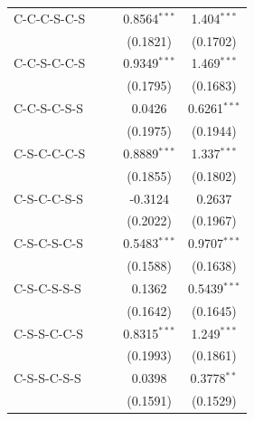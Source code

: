 \begin{table}[htbp]
\begin{tabular}{lcccc}
      C-C-C-S-C-S                     &                &                & 0.8564$^{***}$ & 1.404$^{***}$\\   
                                      &                &                & (0.1821)       & (0.1702)\\   
      C-C-S-C-C-S                     &                &                & 0.9349$^{***}$ & 1.469$^{***}$\\   
                                      &                &                & (0.1795)       & (0.1683)\\   
      C-C-S-C-S-S                     &                &                & 0.0426         & 0.6261$^{***}$\\   
                                      &                &                & (0.1975)       & (0.1944)\\   
      C-S-C-C-C-S                     &                &                & 0.8889$^{***}$ & 1.337$^{***}$\\   
                                      &                &                & (0.1855)       & (0.1802)\\   
      C-S-C-C-S-S                     &                &                & -0.3124        & 0.2637\\   
                                      &                &                & (0.2022)       & (0.1967)\\   
      C-S-C-S-C-S                     &                &                & 0.5483$^{***}$ & 0.9707$^{***}$\\   
                                      &                &                & (0.1588)       & (0.1638)\\   
      C-S-C-S-S-S                     &                &                & 0.1362         & 0.5439$^{***}$\\   
                                      &                &                & (0.1642)       & (0.1645)\\   
      C-S-S-C-C-S                     &                &                & 0.8315$^{***}$ & 1.249$^{***}$\\   
                                      &                &                & (0.1993)       & (0.1861)\\   
      C-S-S-C-S-S                     &                &                & 0.0398         & 0.3778$^{**}$\\   
                                      &                &                & (0.1591)       & (0.1529)\\   

\end{tabular}
\end{table}
